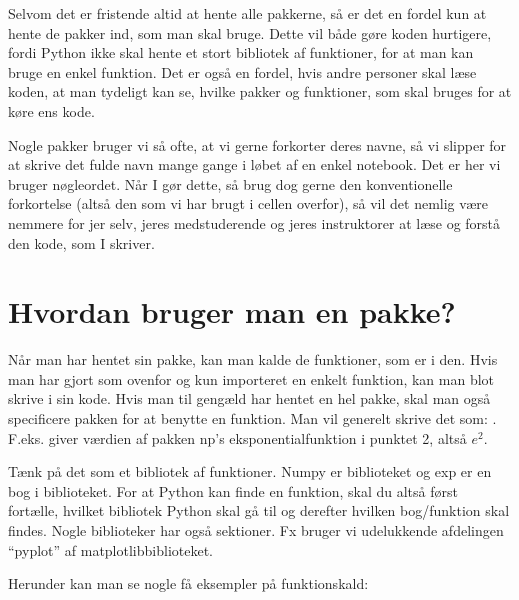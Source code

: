 \documentclass[letterpaper,10pt,english]{jupyterBook}
\begin{document}
Selvom det er fristende altid at hente alle pakkerne, så er det en fordel kun at hente de pakker ind, som man skal bruge. Dette vil både gøre koden hurtigere, fordi Python ikke skal hente et stort bibliotek af funktioner, for at man kan bruge en enkel funktion. Det er også en fordel, hvis andre personer skal læse koden, at man tydeligt kan se, hvilke pakker og funktioner, som skal bruges for at køre ens kode.

Nogle pakker bruger vi så ofte, at vi gerne forkorter deres navne, så vi slipper for at skrive det fulde navn mange gange i løbet af en enkel notebook. Det er her vi bruger  nøgleordet. Når I gør dette, så brug dog gerne den konventionelle forkortelse (altså den som vi har brugt i cellen overfor), så vil det nemlig være nemmere for jer selv, jeres medstuderende og jeres instruktorer at læse og forstå den kode, som I skriver.


\section{Hvordan bruger man en pakke?}
\label{\detokenize{notebooks/Intro_til_pakker:hvordan-bruger-man-en-pakke}}
Når man har hentet sin pakke, kan man kalde de funktioner, som er i den. Hvis man har gjort som  ovenfor og kun importeret en enkelt funktion, kan man blot skrive  i sin kode. Hvis man til gengæld har hentet en hel pakke, skal man også specificere pakken for at benytte en funktion. Man vil generelt skrive det som: . F.eks. giver  værdien af pakken np’s eksponentialfunktion i punktet 2, altså \(e^2\).

Tænk på det som et bibliotek af funktioner. Numpy er biblioteket og exp er en bog i biblioteket. For at Python kan finde en funktion, skal du altså først fortælle, hvilket bibliotek Python skal gå til og derefter hvilken bog/funktion skal findes. Nogle biblioteker har også sektioner. Fx bruger vi udelukkende afdelingen “pyplot” af matplotlib\sphinxhyphen{}biblioteket.

Herunder kan man se nogle få eksempler på funktionskald:

\begin{sphinxVerbatim}[commandchars=\\\{\}]
\end{sphinxVerbatim}
\end{document}
